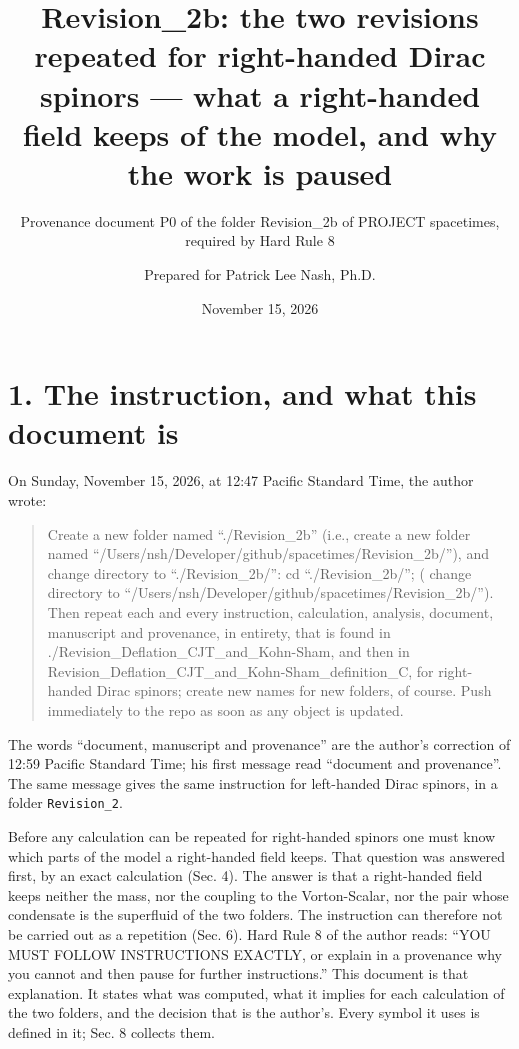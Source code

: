 \documentclass[
  10pt,
]{article}
\title{Revision\_2b: the two revisions repeated for right-handed Dirac
spinors --- what a right-handed field keeps of the model, and why the
work is paused}
\subtitle{Provenance document P0 of the folder Revision\_2b of PROJECT
spacetimes, required by Hard Rule 8}
\author{Prepared for Patrick Lee Nash, Ph.D.}
\date{November 15, 2026}
\begin{document}
\maketitle

\hypertarget{the-instruction-and-what-this-document-is}{%
\section{1. The instruction, and what this document
is}\label{the-instruction-and-what-this-document-is}}

On Sunday, November 15, 2026, at 12:47 Pacific Standard Time, the author
wrote:

\begin{quote}
Create a new folder named ``./Revision\_2b'' (i.e., create a new folder
named ``/Users/nsh/Developer/github/spacetimes/Revision\_2b/''), and
change directory to ``./Revision\_2b/'': cd ``./Revision\_2b/''; (
change directory to
``/Users/nsh/Developer/github/spacetimes/Revision\_2b/''). Then repeat
each and every instruction, calculation, analysis, document, manuscript
and provenance, in entirety, that is found in
./Revision\_Deflation\_CJT\_and\_Kohn-Sham, and then in
Revision\_Deflation\_CJT\_and\_Kohn-Sham\_definition\_C, for
right-handed Dirac spinors; create new names for new folders, of course.
Push immediately to the repo as soon as any object is updated.
\end{quote}

The words ``document, manuscript and provenance'' are the author's
correction of 12:59 Pacific Standard Time; his first message read
``document and provenance''. The same message gives the same instruction
for left-handed Dirac spinors, in a folder \texttt{Revision\_2}.

Before any calculation can be repeated for right-handed spinors one must
know which parts of the model a right-handed field keeps. That question
was answered first, by an exact calculation (Sec. 4). The answer is that
a right-handed field keeps neither the mass, nor the coupling to the
Vorton-Scalar, nor the pair whose condensate is the superfluid of the
two folders. The instruction can therefore not be carried out as a
repetition (Sec. 6). Hard Rule 8 of the author reads: ``YOU MUST FOLLOW
INSTRUCTIONS EXACTLY, or explain in a provenance why you cannot and then
pause for further instructions.'' This document is that explanation. It
states what was computed, what it implies for each calculation of the
two folders, and the decision that is the author's. Every symbol it uses
is defined in it; Sec. 8 collects them.
\end{document}
